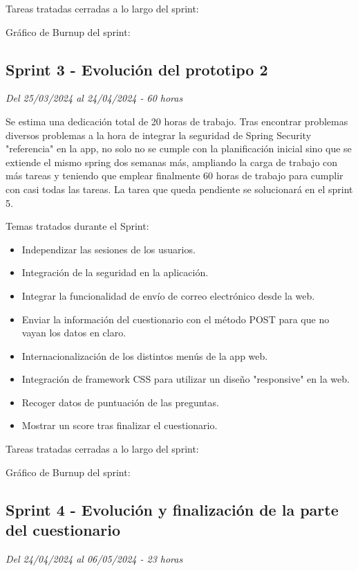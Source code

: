Tareas tratadas cerradas a lo largo del sprint:

Gráfico de Burnup del sprint:


\subsection{Sprint 3 - Evolución del prototipo 2}
\textit{Del 25/03/2024 al 24/04/2024 - 60 horas}

Se estima una dedicación total de 20 horas de trabajo.
Tras encontrar problemas diversos problemas a la hora de integrar la seguridad de Spring Security "referencia" en la app, no solo no se cumple con la planificación inicial sino que se extiende el mismo spring dos semanas más, ampliando la carga de trabajo con más tareas y teniendo que emplear finalmente 60 horas de trabajo para cumplir con casi todas las tareas.
La tarea que queda pendiente se solucionará en el sprint 5.

Temas tratados durante el Sprint:
\begin{itemize}
	\item
	Independizar las sesiones de los usuarios.
	\item
	Integración de la seguridad en la aplicación.
	\item
	Integrar la funcionalidad de envío de correo electrónico desde la web.
	\item
	Enviar la información del cuestionario con el método POST para que no vayan los datos en claro.
	\item
	Internacionalización de los distintos menús de la app web.
	\item
	Integración de framework CSS para utilizar un diseño "responsive" en la web.
	\item
	Recoger datos de puntuación de las preguntas.
	\item
	Mostrar un score tras finalizar el cuestionario.
\end{itemize}

Tareas tratadas cerradas a lo largo del sprint:

Gráfico de Burnup del sprint:


\subsection{Sprint 4 - Evolución y finalización de la parte del cuestionario}
\textit{Del 24/04/2024 al 06/05/2024 - 23 horas}


